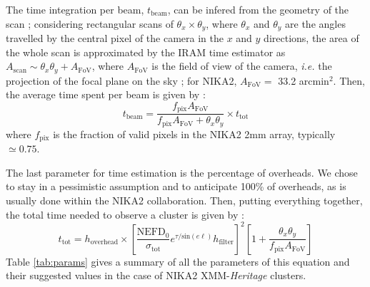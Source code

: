\documentclass[11pt]{article}
\begin{document}
The time integration per beam, $t_\mathrm{beam}$, can be infered from the geometry of the scan ; considering rectangular scans of $\theta_x \times \theta_y$, where $\theta_x$ and $\theta_y$ are the angles travelled by the central pixel of the camera in the $x$ and $y$ directions, the area of the whole scan is approximated by the IRAM time estimator as $A_\mathrm{scan} \sim \theta_x \theta_y + A_\mathrm{FoV}$, where $A_\mathrm{FoV}$ is the field of view of the camera, \textit{i.e.} the projection of the focal plane on the sky ; for NIKA2, $A_\mathrm{FoV} =$ 33.2 arcmin$^2$.
Then, the average time spent per beam is given by :
    \begin{equation}
        t_\mathrm{beam} = \frac{f_\mathrm{pix}A_\mathrm{FoV}}{f_\mathrm{pix}A_\mathrm{FoV} + \theta_x \theta_y}\times t_\mathrm{tot}
    \end{equation}
where $f_\mathrm{pix}$ is the fraction of valid pixels in the NIKA2 2mm array, typically $\simeq 0.75$.

The last parameter for time estimation is the percentage of overheads.
We chose to stay in a pessimistic assumption and to anticipate 100\% of overheads, as is usually done within the NIKA2 collaboration.
Then, putting everything together, the total time needed to observe a cluster is given by :
    \begin{equation}
        t_\mathrm{tot} = h_\mathrm{overhead}\times\left[\frac{\mathrm{NEFD}_0}{\sigma_\mathrm{tot}}e^{\tau/\mathrm{sin}(e\ell)}h_\mathrm{filter}\right]^2 \left[1+\frac{\theta_x \theta_y}{f_\mathrm{pix}A_\mathrm{FoV}}\right]
    \end{equation}
Table \ref{tab:params} gives a summary of all the parameters of this equation and their suggested values in the case of NIKA2 XMM-\textit{Heritage} clusters.
\end{document}
